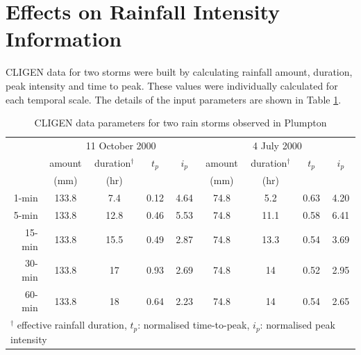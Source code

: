 
\section{Effects on Rainfall Intensity Information}
\label{sec:EffectsOnRainfallIntensityInput}

CLIGEN data for two storms were built by calculating rainfall amount, duration,
peak intensity and time to peak. These values were individually calculated for
each temporal scale. The details of the input parameters are shown in Table
\ref{tab:CLIGENWEPPInputFileParameters}.

\begin{table}[htbp]
  \centering
  \small
  \caption{CLIGEN data parameters for two rain storms observed in
Plumpton}
  \label{tab:CLIGENWEPPInputFileParameters}
    \begin{tabular}{rcccccccc} \toprule
       & \multicolumn{4}{c}{11 October 2000} &
\multicolumn{4}{c}{4 July 2000}\\
       \cmidrule(r){2-5} \cmidrule(l){6-9}
       & amount & duration$^{\dagger}$ & $t_p$ & $i_p$ & amount &
duration$^{\dagger}$ & $t_p$ & $i_p$\\
       & \scriptsize(mm) & \scriptsize(hr) & & & \scriptsize(mm) &
\scriptsize(hr) & & \\
       \midrule
      1-min  & 133.8 & 7.4  & 0.12 & 4.64 & 74.8 & 5.2  & 0.63 & 4.20\\
      5-min  & 133.8 & 12.8 & 0.46 & 5.53 & 74.8 & 11.1 & 0.58 & 6.41\\
      15-min & 133.8 & 15.5 & 0.49 & 2.87 & 74.8 & 13.3 & 0.54 & 3.69\\
      30-min & 133.8 & 17   & 0.93 & 2.69 & 74.8 & 14   & 0.52 & 2.95\\
      60-min & 133.8 & 18   & 0.64 & 2.23 & 74.8 & 14   & 0.54 & 2.65\\
      \bottomrule
      \multicolumn{9}{l}{\footnotesize $^\dagger$ effective rainfall
duration, {\normalsize{$t_p$}}: normalised time-to-peak, {\normalsize{$i_p$}}:
normalised peak intensity}
    \end{tabular}
\end{table}

